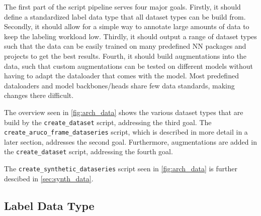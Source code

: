 \documentclass[10pt]{book}
\newcommand{\figureref}[1]{\autoref{#1}}
\begin{document}
The first part of the script pipeline serves four major goals. Firstly, it should define a standardized label data type that all dataset types can be build from. Secondly, it should allow for a simple way to annotate large amounts of data to keep the labeling workload low. Thirdly, it should output a range of dataset types such that the data can be easily trained on many predefined \ac{NN} packages and projects to get the best results. Fourth, it should build augmentations into the data, such that custom augmentations can be tested on different models without having to adapt the dataloader that comes with the model. Most predefined dataloaders and model backbones/heads share few data standards, making changes there difficult.

The overview seen in \figureref{fig:arch_data} shows the various dataset types that are build by the \texttt{create\_dataset} script, addressing the third goal. The \texttt{create\_aruco\_frame\_dataseries} script, which is described in more detail in a later section, addresses the second goal. Furthermore, augmentations are added in the \texttt{create\_dataset} script, addressing the fourth goal.

The \texttt{create\_synthetic\_dataseries} script seen in \figureref{fig:arch_data} is further descibed in \autoref{sec:synth_data}.

\subsection{Label Data Type}
\end{document}
